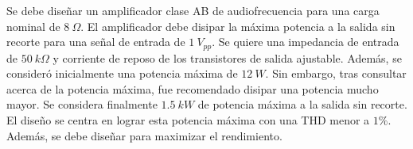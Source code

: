 Se debe diseñar un amplificador clase AB de audiofrecuencia para una carga nominal de $8 \ \Omega$. El amplificador debe disipar la máxima potencia a la salida sin recorte para una señal de entrada de $1 \ V_{pp}$. Se quiere una impedancia de entrada de $50 \ k\Omega$ y corriente de reposo de los transistores de salida ajustable. Además, se consideró inicialmente una potencia máxima de $12 \ W$. Sin embargo, tras consultar acerca de la potencia máxima, fue recomendado disipar una potencia mucho mayor. Se considera finalmente $1.5 \ kW$ de potencia máxima a la salida sin recorte. El diseño se centra en lograr esta potencia máxima con una THD menor a $1\%$. Además, se debe diseñar para maximizar el rendimiento.
